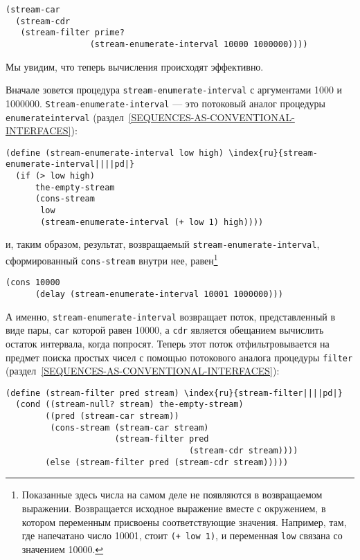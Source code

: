 \begin{Verbatim}[fontsize=\small]
(stream-car
  (stream-cdr
   (stream-filter prime?
                 (stream-enumerate-interval 10000 1000000))))
\end{Verbatim}

Мы увидим, что теперь вычисления происходят эффективно.

Вначале зовется процедура {\tt stream-enumerate-interval} с
аргументами 1000 и 1000000. {\tt Stream-enumerate-interval} ---
это потоковый аналог процедуры {\tt enumerate\-interval} %
(раздел~\ref{SEQUENCES-AS-CONVENTIONAL-INTERFACES}):

\begin{Verbatim}[fontsize=\small]
(define (stream-enumerate-interval low high) \index{ru}{stream-enumerate-interval||||pd|}
  (if (> low high)
      the-empty-stream
      (cons-stream
       low
       (stream-enumerate-interval (+ low 1) high))))
\end{Verbatim}
и, таким образом, результат, возвращаемый
{\tt stream-enumerate-in\-ter\-val}, \linebreak
сфор\-ми\-ро\-ванный {\tt cons-stream} внутри нее, равен\footnote{Показанные здесь числа на самом деле не появляются в
возвращаемом выражении.  Возвращается исходное выражение вместе с
окружением, в котором переменным присвоены соответствующие значения.
Например, там, где напечатано число 10001, стоит {\tt (+ low
1)}, и переменная {\tt low} связана со значением
10000.
}

\begin{Verbatim}[fontsize=\small]
(cons 10000
      (delay (stream-enumerate-interval 10001 1000000)))
\end{Verbatim}

А именно, {\tt stream-enumerate-interval} возвращает поток,
представленный в виде пары, {\tt car} которой равен 10000,
а {\tt cdr} является обещанием вычислить остаток интервала,
когда попросят.  Теперь этот поток отфильтровывается на предмет поиска
простых чисел с помощью потокового аналога процедуры
{\tt filter} (раздел~\ref{SEQUENCES-AS-CONVENTIONAL-INTERFACES}):

\begin{Verbatim}[fontsize=\small]
(define (stream-filter pred stream) \index{ru}{stream-filter||||pd|}
  (cond ((stream-null? stream) the-empty-stream)
        ((pred (stream-car stream))
         (cons-stream (stream-car stream)
                      (stream-filter pred
                                     (stream-cdr stream))))
        (else (stream-filter pred (stream-cdr stream)))))
\end{Verbatim}

